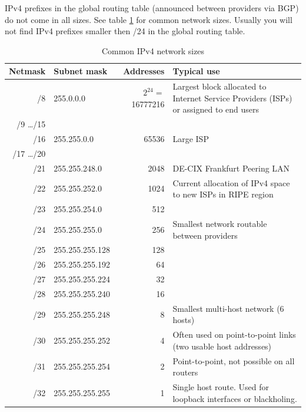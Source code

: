 IPv4 prefixes in the \gls{global routing table} (announced between providers via BGP)
do not come in all sizes. See table \ref{tab:ipv4sizes} for common network sizes. Usually you will not find IPv4 prefixes smaller then /24 in the \gls{global routing table}.
\begin{table}[hbp]
  \caption{Common IPv4 network sizes}
\label{tab:ipv4sizes}
  \begin{tabularx}{\textwidth}{rlrX}
    \textbf{Netmask} & \textbf{Subnet mask} & \textbf{Addresses} & \textbf{Typical use} \\
    \hline
    /8 & 255.0.0.0 & \(2^{24} =\) \tiny{16777216} & Largest block allocated to Internet
        Service Providers (ISPs) or assigned to end users \\
    /9 \ldots /15 \\
    /16 & 255.255.0.0 & 65536 & Large ISP \\
    /17 \ldots /20 \\
    /21 & 255.255.248.0 & 2048 & DE-CIX Frankfurt Peering LAN\\
    /22 & 255.255.252.0 & 1024 & Current allocation of IPv4 space to new ISPs in \gls{RIPE} region \\
    /23 & 255.255.254.0 &  512 \\
    /24 & 255.255.255.0 &  256 & Smallest network routable between providers \\
    /25 & 255.255.255.128 & 128 & \\
    /26 & 255.255.255.192 &  64 & \\
    /27 & 255.255.255.224 &  32 & \\
    /28 & 255.255.255.240 &  16 \\
    /29 & 255.255.255.248 &   8 & Smallest multi-host network (6 hosts)\\
    /30 & 255.255.255.252 &   4 & Often used on point-to-point links (two usable host addresses)\\
    /31 & 255.255.255.254 &   2 & Point-to-point, not possible on all routers\\
    /32 & 255.255.255.255 &   1 & Single host route. Used for loopback interfaces or \gls{blackholing}.\\

  \end{tabularx}
\end{table}


